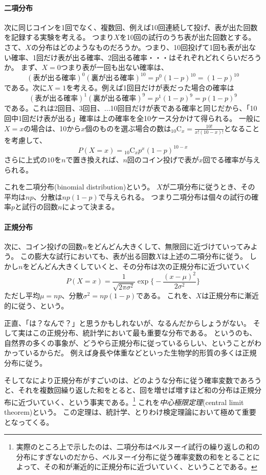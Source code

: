 \documentclass{jsarticle}
\begin{document}
\paragraph{二項分布\\}
次に同じコインを1回でなく、複数回、例えば10回連続して投げ、表が出た回数を記録する実験を考える。
つまり$X$を10回の試行のうち表が出た回数とする。
さて、$X$の分布はどのようなものだろうか。つまり、10回投げて1回も表が出ない確率、1回だけ表が出る確率、2回出る確率・・・はそれぞれどれくらいだろうか。
まず、$X=0$つまり表が一回も出ない確率は、
\[
(\textrm{表が出る確率})^{0}(\textrm{裏が出る確率})^{10} = p^0 (1-p)^{10} = (1-p)^{10}
\]
である。次に$X=1$を考える。例えば1回目だけが表だった場合の確率は
\[
(\textrm{表が出る確率})^{1}(\textrm{裏が出る確率})^{9} = p^1 (1-p)^9 = p(1-p)^{9}
\]
である。これは2回目、3回目、...10回目だけが表である確率と同じだから、「10回中1回だけ表が出る」確率は上の確率を全10ケース分かけて得られる。
一般に$X=x$の場合は、10から$x$個のものを選ぶ場合の数は${}_{10} \mathrm{C}_{x} = \frac{10! }{x!(10-x)!}$となることを考慮して、
\[
 P(X=x) = {}_{10} \mathrm{C}_{x}  p^{x} (1-p)^{10-x}
\]
さらに上式の$10$を$n$で置き換えれば、$n$回のコイン投げで表が$x$回でる確率が与えられる。

これを二項分布(binomial distribution)という。
$X$が二項分布に従うとき、その平均は$np$、分散は$np(1-p)$で与えられる。
つまり二項分布は個々の試行の確率$p$と試行の回数$n$によって決まる。


\paragraph{正規分布 \\}
次に、コイン投げの回数$n$をどんどん大きくして、無限回に近づけていってみよう。
この膨大な試行においても、表が出る回数$X$は上述の二項分布に従う。
しかし$n$をどんどん大きくしていくと、その分布は次の正規分布に近づいていく
\[
 P(X=x) = \frac{1}{\sqrt{2\pi \sigma^2}} \exp \biggl\{ - \frac{(x - \mu)^2}{2\sigma^2} \biggr\}
\]
ただし平均$\mu = np$、分散$\sigma^2 = np(1-p)$である。
これを、$X$は正規分布に漸近的に従う、という。

正直、「は？なんで？」と思うかもしれないが、なるんだからしょうがない。
そして実はこの正規分布、統計学において最も重要な分布である。
というのも、自然界の多くの事象が、どうやら正規分布に従っているらしい、ということがわかっているからだ。
例えば身長や体重などといった生物学的形質の多くは正規分布に従う。

そしてなにより正規分布がすごいのは、どのような分布に従う確率変数であろうと、それを複数回繰り返した和をとると、回を増せば増すほど和の分布は正規分布に近づいていく、という事実である。\footnote{実際のところ上で示したのは、二項分布はベルヌーイ試行の繰り返しの和の分布にすぎないのだから、ベルヌーイ分布に従う確率変数の和をとることによって、その和が漸近的に正規分布に近づいていく、ということである。}
これを\emph{中心極限定理}(central limit theorem)という。
この定理は、統計学、とりわけ検定理論において極めて重要となってくる。
\end{document}
